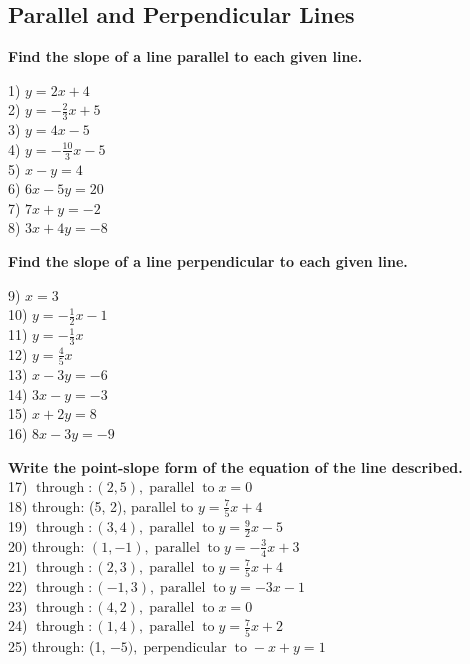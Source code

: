 \documentclass[12pt]{book}
\theoremstyle{definition}
\newcommand{\tmop}[1]{\ensuremath{\operatorname{#1}}}
\begin{document}
\subsection*{Parallel and Perpendicular Lines}
{\bf Find the slope of a line parallel to each given line.}
\begin{multicols}{4}
  1) $y = 2 x + 4$\\
  2) $y = - \frac{2}{3} x + 5$\\
  3) $y = 4 x - 5$\\
  4) $y = - \frac{10}{3} x - 5$\\
  5) $x - y = 4$\\
  6) $6 x - 5 y = 20$\\
  7) $7 x + y = - 2$\\
  8) $3 x + 4 y = - 8$
\end{multicols}
{\bf Find the slope of a line perpendicular to each given line.}
\begin{multicols}{4}
  9) $x = 3$\\
  10) $y = - \frac{1}{2} x - 1$\\
  11) $y = - \frac{1}{3} x$\\
  12) $y = \frac{4}{5} x$\\
  13) $x - 3 y = - 6$\\
  14) $3 x - y = - 3$\\
  15) $x + 2 y = 8$\\
  16) $8 x - 3 y = - 9$
\end{multicols}
{\bf Write the point-slope form of the equation of the line described.}\\
17) $\tmop{through} : (2, 5), \tmop{parallel} \tmop{to} x = 0$\\
18) through: (5, 2), parallel to $y = \frac{7}{5} x + 4$\\
19) $\tmop{through} : (3, 4), \tmop{parallel} \tmop{to} y = \frac{9}{2} x - 5$\\
20) through: $(1, - 1), \tmop{parallel} \tmop{to} y = - \frac{3}{4} x + 3$\\
21) $\tmop{through} : (2, 3), \tmop{parallel} \tmop{to} y = \frac{7}{5} x + 4$\\
22) $\tmop{through} : (- 1, 3), \tmop{parallel} \tmop{to} y = - 3 x - 1$\\
23) $\tmop{through} : (4, 2), \tmop{parallel} \tmop{to} x = 0$\\
24) $\tmop{through} : (1, 4), \tmop{parallel} \tmop{to} y = \frac{7}{5} x + 2$\\
25) through: (1, $- 5), \tmop{perpendicular} \tmop{to} - x + y = 1$\\
\end{document}
